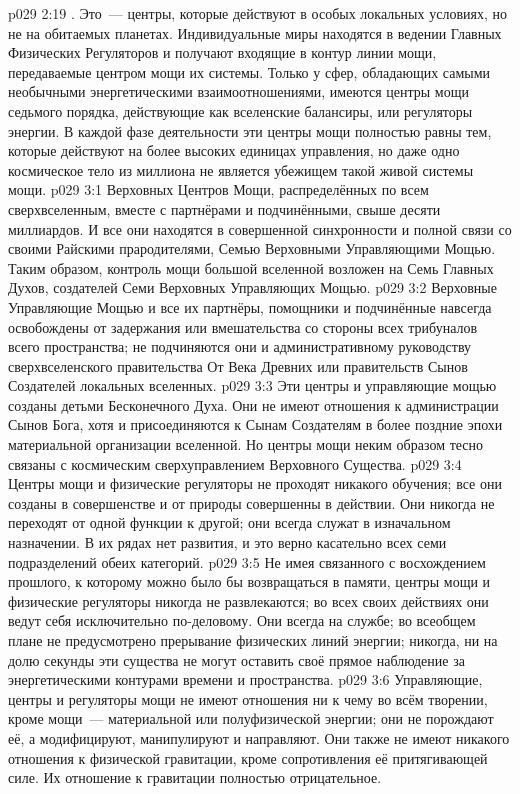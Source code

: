 \vs p029 2:19 . Это~--- центры, которые действуют в особых локальных условиях, но не на обитаемых планетах. Индивидуальные миры находятся в ведении Главных Физических Регуляторов и получают входящие в контур линии мощи, передаваемые центром мощи их системы. Только у сфер, обладающих самыми необычными энергетическими взаимоотношениями, имеются центры мощи седьмого порядка, действующие как вселенские балансиры, или регуляторы энергии. В каждой фазе деятельности эти центры мощи полностью равны тем, которые действуют на более высоких единицах управления, но даже одно космическое тело из миллиона не является убежищем такой живой системы мощи.
\vs p029 3:1 Верховных Центров Мощи, распределённых по всем сверхвселенным, вместе с партнёрами и подчинёнными, свыше десяти миллиардов. И все они находятся в совершенной синхронности и полной связи со своими Райскими прародителями, Семью Верховными Управляющими Мощью. Таким образом, контроль мощи большой вселенной возложен на Семь Главных Духов, создателей Семи Верховных Управляющих Мощью.
\vs p029 3:2 Верховные Управляющие Мощью и все их партнёры, помощники и подчинённые навсегда освобождены от задержания или вмешательства со стороны всех трибуналов всего пространства; не подчиняются они и административному руководству сверхвселенского правительства От Века Древних или правительств Сынов Создателей локальных вселенных.
\vs p029 3:3 Эти центры и управляющие мощью созданы детьми Бесконечного Духа. Они не имеют отношения к администрации Сынов Бога, хотя и присоединяются к Сынам Создателям в более поздние эпохи материальной организации вселенной. Но центры мощи неким образом тесно связаны с космическим сверхуправлением Верховного Существа.
\vs p029 3:4 \pc Центры мощи и физические регуляторы не проходят никакого обучения; все они созданы в совершенстве и от природы совершенны в действии. Они никогда не переходят от одной функции к другой; они всегда служат в изначальном назначении. В их рядах нет развития, и это верно касательно всех семи подразделений обеих категорий.
\vs p029 3:5 Не имея связанного с восхождением прошлого, к которому можно было бы возвращаться в памяти, центры мощи и физические регуляторы никогда не развлекаются; во всех своих действиях они ведут себя исключительно по\hyp{}деловому. Они всегда на службе; во всеобщем плане не предусмотрено прерывание физических линий энергии; никогда, ни на долю секунды эти существа не могут оставить своё прямое наблюдение за энергетическими контурами времени и пространства.
\vs p029 3:6 \pc Управляющие, центры и регуляторы мощи не имеют отношения ни к чему во всём творении, кроме мощи~--- материальной или полуфизической энергии; они не порождают её, а модифицируют, манипулируют и направляют. Они также не имеют никакого отношения к физической гравитации, кроме сопротивления её притягивающей силе. Их отношение к гравитации полностью отрицательное.
